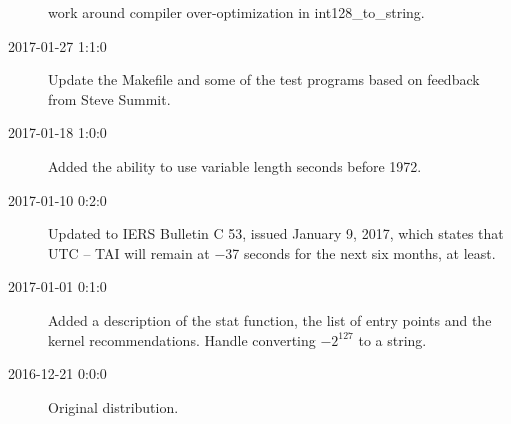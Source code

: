\documentclass[letterpaper,twoside]{article}
\begin{document}
\begin{description}
  work around compiler over-optimization in int128\_to\_string.
\item[2017-01-27 1:1:0] Update the Makefile and some of the test programs
  based on feedback from Steve Summit.
\item[2017-01-18 1:0:0] Added the ability to use variable length seconds
  before 1972.
\item[2017-01-10 0:2:0] Updated to IERS Bulletin C 53,
  issued January 9, 2017, which states that UTC -- TAI
  will remain at \num{-37} seconds for the next six months, at least.
\item[2017-01-01 0:1:0] Added a description of the stat function,
  the list of entry points and the kernel recommendations.
  Handle converting $-2^{127}$ to a string. 
\item[2016-12-21 0:0:0] Original distribution.
\end{description}


\end{document}
